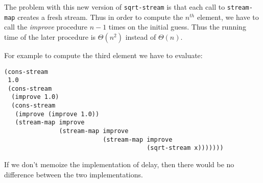 \documentclass[a4paper,12pt]{article}
\begin{document}
The problem with this new version of \lstinline!sqrt-stream! is that
each call to \lstinline!stream-map! creates a fresh stream.  Thus in
order to compute the $n^{th}$ element, we have to call the
\emph{improve} procedure $n-1$ times on the initial guess.  Thus the
running time of the later procedure is $\Theta(n^2)$ instead of
$\Theta(n)$.

For example to compute the third element we have to evaluate:
\begin{lstlisting}
(cons-stream
 1.0
 (cons-stream
  (improve 1.0)
  (cons-stream
   (improve (improve 1.0))
   (stream-map improve
               (stream-map improve
                           (stream-map improve
                                       (sqrt-stream x)))))))
\end{lstlisting}
If we don't memoize the implementation of delay, then there would be
no difference between the two implementations.
\end{document}
